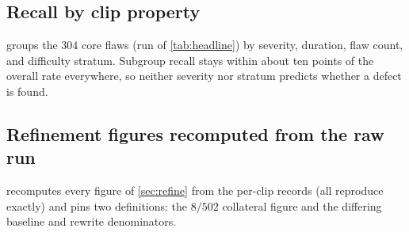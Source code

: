 

\subsection{Recall by clip property}\label{sec:app-robust}
 groups the $304$ core flaws (run of \cref{tab:headline}) by severity, duration,
flaw count, and difficulty stratum. Subgroup recall stays within about ten points of the overall
rate everywhere, so neither severity nor stratum predicts whether a defect is found.



\subsection{Refinement figures recomputed from the raw run}\label{sec:app-refine-verify}
 recomputes every figure of \cref{sec:refine} from the per-clip records (all
reproduce exactly) and pins two definitions: the $8/502$ collateral figure and the differing baseline
and rewrite denominators.



\renewcommand{\bibfont}{\footnotesize}
